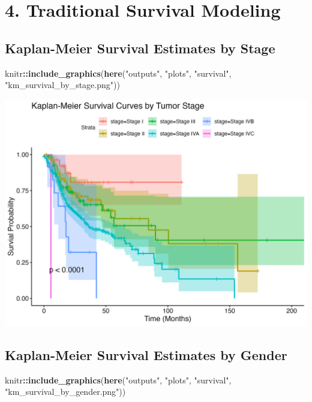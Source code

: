 \documentclass[
  11pt,
]{article}
\newenvironment{Shaded}{\begin{snugshade}}{\end{snugshade}}
\newcommand{\FunctionTok}[1]{\textcolor[rgb]{0.13,0.29,0.53}{\textbf{#1}}}
\newcommand{\NormalTok}[1]{#1}
\newcommand{\SpecialCharTok}[1]{\textcolor[rgb]{0.81,0.36,0.00}{\textbf{#1}}}
\newcommand{\StringTok}[1]{\textcolor[rgb]{0.31,0.60,0.02}{#1}}
\begin{document}
\section{4. Traditional Survival
Modeling}\label{traditional-survival-modeling}

\subsection{Kaplan-Meier Survival Estimates by
Stage}\label{kaplan-meier-survival-estimates-by-stage}

\begin{Shaded}
\begin{Highlighting}[]
\NormalTok{knitr}\SpecialCharTok{::}\FunctionTok{include\_graphics}\NormalTok{(}\FunctionTok{here}\NormalTok{(}\StringTok{"outputs"}\NormalTok{, }\StringTok{"plots"}\NormalTok{, }\StringTok{"survival"}\NormalTok{, }\StringTok{"km\_survival\_by\_stage.png"}\NormalTok{))}
\end{Highlighting}
\end{Shaded}

\includegraphics[width=0.8\linewidth]{../outputs/plots/survival/km_survival_by_stage}

\subsection{Kaplan-Meier Survival Estimates by
Gender}\label{kaplan-meier-survival-estimates-by-gender}

\begin{Shaded}
\begin{Highlighting}[]
\NormalTok{knitr}\SpecialCharTok{::}\FunctionTok{include\_graphics}\NormalTok{(}\FunctionTok{here}\NormalTok{(}\StringTok{"outputs"}\NormalTok{, }\StringTok{"plots"}\NormalTok{, }\StringTok{"survival"}\NormalTok{, }\StringTok{"km\_survival\_by\_gender.png"}\NormalTok{))}
\end{Highlighting}
\end{Shaded}
\end{document}
